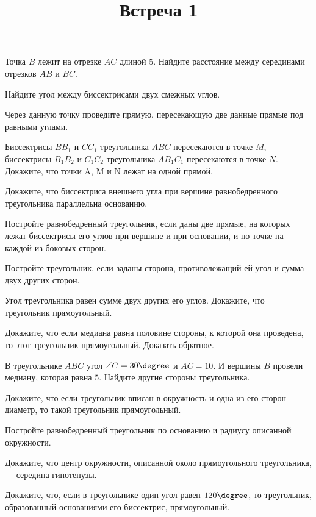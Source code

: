
\title{Встреча 1}
\begin{listofex}
	\item Точка \( B \) лежит на отрезке \( AC \) длиной \( 5 \). Найдите расстояние между серединами отрезков \( AB \) и \( BC \).
	\item Найдите угол между биссектрисами двух смежных углов.
	\item {}
	\item {}
	\item Через данную точку проведите прямую, пересекающую две данные прямые под равными углами.
	\item {}
	\item Биссектрисы \( BB_1 \) и \( CC_1 \) треугольника \( ABC \) пересекаются в точке \( M \), биссектрисы \( B_1B_2 \) и \( C_1C_2 \) треугольника \( AB_1C_1 \) пересекаются в точке \( N \). Докажите, что точки A, M и N лежат на одной прямой.
	\item Докажите, что биссектриса внешнего угла при вершине равнобедренного треугольника параллельна основанию.
	\item Постройте равнобедренный треугольник, если даны две прямые, на которых лежат биссектрисы его углов при вершине и при основании, и по точке на каждой из боковых сторон.
	\item Постройте треугольник, если заданы сторона, противолежащий ей угол и сумма двух других сторон.
	
	\item {}
	\item {}
	
	\item Угол треугольника равен сумме двух других его углов. Докажите, что треугольник прямоугольный.
	\item Докажите, что если медиана равна половине стороны, к которой она проведена, то этот треугольник прямоугольный. Доказать обратное.
	\item В треугольнике \( ABC \) угол \( \angle C = 30\degree \) и \( AC = 10 \). И вершины \( B \) провели медиану, которая равна \( 5 \). Найдите другие стороны треугольника.
	\item Докажите, что если треугольник вписан в окружность и одна из его сторон -- диаметр, то такой треугольник прямоугольный.
	\item Постройте равнобедренный треугольник по основанию и радиусу описанной окружности.
	\item Докажите, что центр окружности, описанной около прямоугольного треугольника, --- середина гипотенузы.
	
	\item Докажите, что, если в треугольнике один угол равен \( 120\degree \), то треугольник, образованный основаниями его биссектрис, прямоугольный.
\end{listofex}
